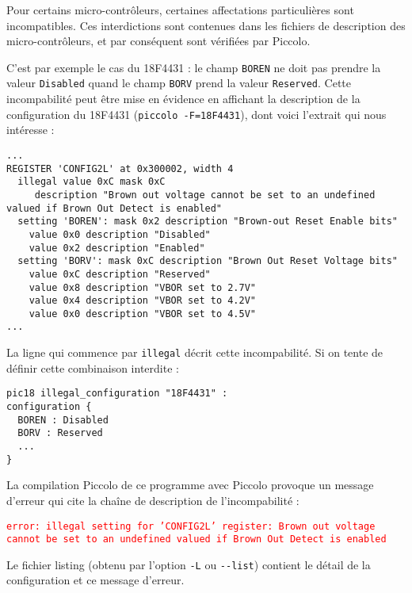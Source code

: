 Pour certains micro-contrôleurs, certaines affectations particulières sont incompatibles. Ces interdictions sont contenues dans les fichiers de description des micro-contrôleurs, et par conséquent sont vérifiées par Piccolo. 

C’est par exemple le cas du 18F4431 : le champ \texttt{BOREN} ne doit pas prendre la valeur \texttt{Disabled} quand le champ \texttt{BORV} prend la valeur \texttt{Reserved}. Cette incompabilité peut être mise en évidence en affichant la description de la configuration du 18F4431 (\texttt{piccolo -F=18F4431}), dont voici l'extrait qui nous intéresse :
{\small
\begin{lstlisting}[frame=l]
...
REGISTER 'CONFIG2L' at 0x300002, width 4
  illegal value 0xC mask 0xC
     description "Brown out voltage cannot be set to an undefined valued if Brown Out Detect is enabled"
  setting 'BOREN': mask 0x2 description "Brown-out Reset Enable bits"
    value 0x0 description "Disabled"
    value 0x2 description "Enabled"
  setting 'BORV': mask 0xC description "Brown Out Reset Voltage bits"
    value 0xC description "Reserved"
    value 0x8 description "VBOR set to 2.7V"
    value 0x4 description "VBOR set to 4.2V"
    value 0x0 description "VBOR set to 4.5V"
...
\end{lstlisting}
}


La ligne qui commence par \texttt{illegal} décrit cette incompabilité. Si on tente de définir cette combinaison interdite :
\begin{lstlisting}[language=piccolo]
pic18 illegal_configuration "18F4431" :
configuration {
  BOREN : Disabled
  BORV : Reserved
  ...
}
\end{lstlisting}

La compilation Piccolo de ce programme avec Piccolo provoque un message d’erreur qui cite la chaîne de description de l'incompabilité :


\textcolor{red}{\tt error: illegal setting for 'CONFIG2L' register: Brown out voltage cannot be set to an undefined valued if Brown Out Detect is enabled}

Le fichier listing (obtenu par l’option \texttt{-L} ou \texttt{-{}-list}) contient le détail de la configuration et ce message d’erreur.

